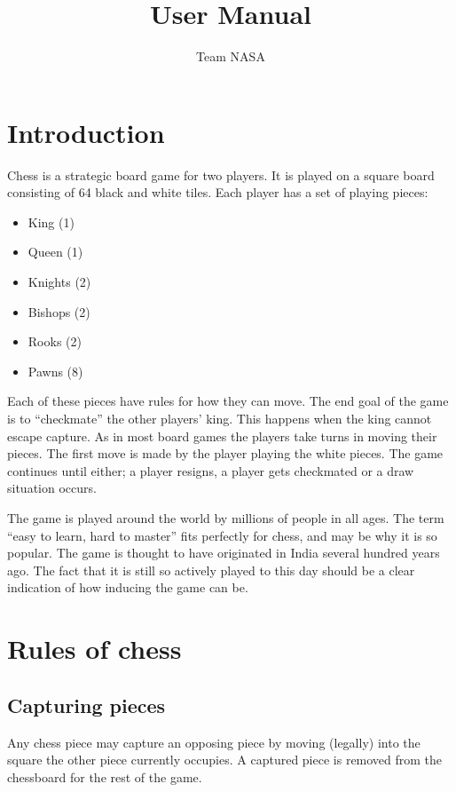 \documentclass[12pt, a4paper]{article}
\title{User Manual}
\author{Team NASA}
\date{}
\begin{document}
\maketitle

\tableofcontents
\pagebreak

\section{Introduction}
Chess is a strategic board game for two players. It is played on a square board consisting of 64 black and white tiles. Each player has a set of playing pieces:
\begin{itemize}
\item King (1)
\item Queen (1)
\item Knights (2)
\item Bishops (2)
\item Rooks (2)
\item Pawns (8)
\end{itemize}

Each of these pieces have rules for how they can move. The end goal of the game is to “checkmate” the other players’ king. This happens when the king cannot escape capture. As in most board games the players take turns in moving their pieces. The first move is made by the player playing the white pieces. The game continues until either; a player resigns, a player gets checkmated or a draw situation occurs.

The game is played around the world by millions of people in all ages. The term “easy to learn, hard to master” fits perfectly for chess, and may be why it is so popular. The game is thought to have originated in India several hundred years ago. The fact that it is still so actively played to this day should be a clear indication of how inducing the game can be.

\section{Rules of chess}

\subsection{Capturing pieces}
Any chess piece may capture an opposing piece by moving (legally) into the square the other piece currently occupies. A captured piece is removed from the chessboard for the rest of the game.
\end{document}

